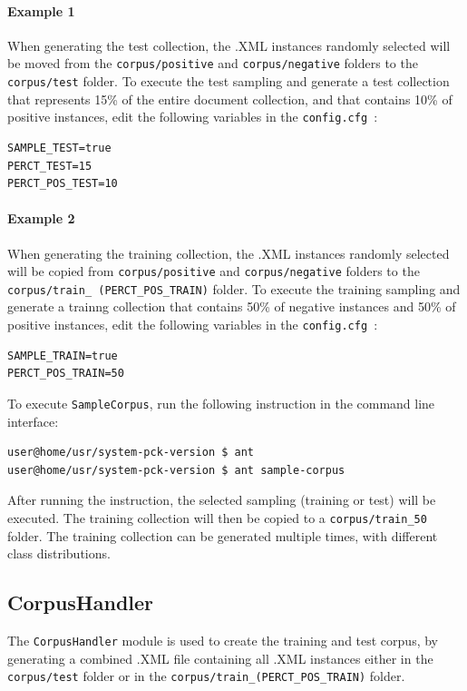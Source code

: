 \documentclass[11pt]{article}
\newcommand{\configfile}{\texttt{config.cfg{ }}}
\begin{document}
\paragraph{Example 1}
When generating the test collection, the .XML instances randomly selected will be moved 
from the \texttt{corpus/positive} and \texttt{corpus/negative} folders to the 
\texttt{corpus/test} folder.
To execute the test sampling and generate a test collection that represents
15\% of the entire document collection, and that contains 10\% of positive instances, 
edit the following variables in the \configfile:
\begin{lstlisting}
SAMPLE_TEST=true
PERCT_TEST=15
PERCT_POS_TEST=10
\end{lstlisting}

\paragraph{Example 2}
When generating the training collection, the .XML instances randomly selected will be 
copied from \texttt{corpus/positive} and \texttt{corpus/negative} folders to the 
\texttt{corpus/train\_ (PERCT\_POS\_TRAIN)} folder.
To execute the training sampling and generate a trainng collection that contains
50\% of negative instances and 50\% of positive instances,
edit the following variables in the \configfile:
\begin{lstlisting}
SAMPLE_TRAIN=true
PERCT_POS_TRAIN=50
\end{lstlisting}

To execute \texttt{SampleCorpus}, run the following instruction in the command line interface:
\begin{lstlisting}
user@home/usr/system-pck-version $ ant
user@home/usr/system-pck-version $ ant sample-corpus
\end{lstlisting}
After running the instruction, the selected sampling (training or test) will be executed.
The training collection will then be copied to a \texttt{corpus/train\_50} folder.
The training collection can be generated multiple times, with different class distributions.

\subsection{CorpusHandler}
The \texttt{CorpusHandler} module is used to create the training and test corpus,
by generating a combined .XML file containing all .XML instances either in the 
\texttt{corpus/test} folder or in the \texttt{corpus/train\_(PERCT\_POS\_TRAIN)} folder.
\end{document}
